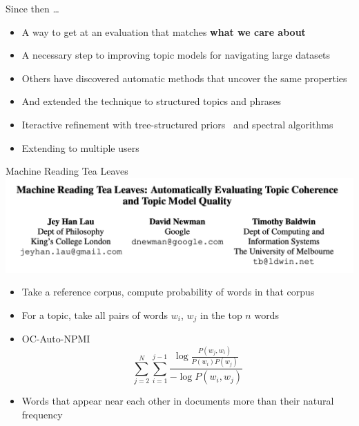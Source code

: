 \documentclass[compress]{beamer}
\begin{document}
\begin{frame}{Since then \dots}

  \begin{itemize}
    \item A way to get at an evaluation that matches {\bf what we care about}
    \item A necessary step to improving topic models for navigating large datasets~\cite{talley-11}
    \item \alert<2>{Others have discovered automatic methods that uncover the same properties}~\cite{newman-10,mimno-11}
    \item And extended the technique to structured topics and
      phrases~\cite{lindsey-12,weninger-12}
      \item Iteractive refinement with tree-structured
        priors~\cite{hu-14} and spectral algorithms~\cite{Lund-17}
    \item Extending to multiple users~\cite{Felt-15}
  \end{itemize}

\end{frame}

\begin{frame}{Machine Reading Tea Leaves}
  \includegraphics[width=.8\paperwidth]{reading_tea_leaves/machine_reading_tea_leaves}

  \begin{itemize}
  \item Take a reference corpus, compute probability of words in that corpus
  \item For a topic, take all pairs of words $w_i$, $w_j$ in the top
    $n$ words
  \item OC-Auto-NPMI
    \begin{equation}
      \sum_{j=2}^{N}\sum_{i=1}^{j-1}{{ \frac{\log \frac{P(w_j,
          w_i)}{P(w_i)P(w_j)}}{-\log P(w_i, w_j)}}}
    \end{equation}
    \item Words that appear near each other in documents more than
      their natural frequency
  \end{itemize}
  
\end{frame}
\end{document}
